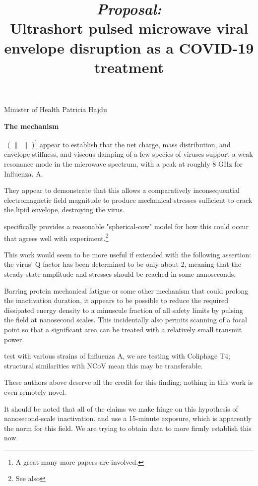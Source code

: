 \documentclass[fleqn,10pt]{paper}
\title{ {\it Proposal:}\\ Ultrashort pulsed microwave viral envelope disruption as a COVID-19 treatment}
\begin{document}
\maketitle


Minister of Health
Patricia Hajdu


{\Large \textbf{The mechanism}}


\cite{Microwave2009} \textrightarrow \ (\cite{focusing2014} $\parallel$ \cite{Efficient2015} $\parallel$ \cite{Resonant2017})\footnote{A great many more papers are involved.} appear to establish that the net charge, mass distribution, and envelope stiffness, and viscous damping of a few species of viruses support a weak resonance mode in the microwave spectrum, with a peak at roughly 8 GHz for Influenza. A.

They appear to demonstrate that this allows a comparatively inconsequential electromagnetic field magnitude to produce mechanical stresses sufficient to crack the lipid envelope, destroying the virus.

\cite{Efficient2015} specifically provides a reasonable "spherical-cow" model for how this could occur that agrees well with experiment.\footnote{See also }

This work would seem to be more useful if extended with the following assertion: the virus' Q factor has been determined to be only about 2, meaning that the steady-state amplitude and stresses should be reached in some nanoseconds.

Barring protein mechanical fatigue\cite{Mechanical2013} or some other mechanism that could prolong the inactivation duration, it appears to be possible to reduce the required dissipated energy density to a minuscule fraction of all safety limits by pulsing the field at nanosecond scales. This incidentally also permits scanning of a focal point so that a significant area can be treated with a relatively small transmit power.

\cite{Efficient2015} test with various strains of Influenza A, we are testing with Coliphage T4; structural similarities with NCoV mean this may be transferable. 

These authors above deserve all the credit for this finding; nothing in this work is even remotely novel.

\begin{autem}
	It should be noted that all of the claims we make hinge on this hypothesis of nanosecond-scale inactivation. \cite{Efficient2015} and \cite{focusing2014} use a 15-minute exposure, which is apparently the norm for this field. We are trying to obtain data to more firmly establish this now.
\end{autem}
\end{document}
